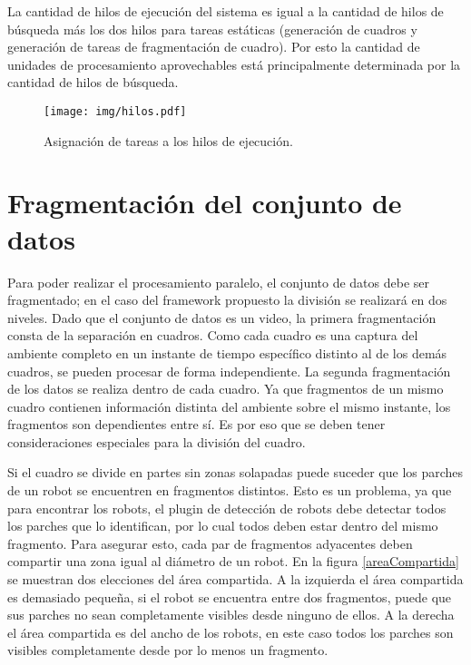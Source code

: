 La cantidad de hilos de ejecución del sistema es igual a la cantidad de hilos de
búsqueda más los dos hilos para tareas estáticas (generación de cuadros y
generación de tareas de fragmentación de cuadro). Por esto la cantidad de
unidades de procesamiento aprovechables está principalmente determinada por la
cantidad de hilos de búsqueda.

\begin{figure}[!htb]

	\texttt{[image: img/hilos.pdf]}

	\caption{Asignación de tareas a los hilos de ejecución.}

	\label{hilosFramework}

\end{figure}

\section{Fragmentación del conjunto de datos}

Para poder realizar el procesamiento paralelo, el conjunto de datos debe ser
fragmentado; en el caso del framework propuesto la división se realizará en
dos niveles. Dado que el conjunto de datos es un video, la primera
fragmentación consta de la separación en cuadros. Como cada cuadro es una
captura del ambiente completo en un instante de tiempo específico distinto al de
los demás cuadros, se pueden procesar de forma independiente. La segunda
fragmentación de los datos se realiza dentro de cada cuadro. Ya que fragmentos
de un mismo cuadro contienen información distinta del ambiente sobre el mismo
instante, los fragmentos son dependientes entre sí. Es por eso que se deben
tener consideraciones especiales para la división del cuadro.

Si el cuadro se divide en partes sin zonas solapadas puede suceder que los
parches de un robot se encuentren en fragmentos distintos. Esto es un problema,
ya que para encontrar los robots, el plugin de detección de robots debe detectar
todos los parches que lo identifican, por lo cual todos deben estar dentro del
mismo fragmento. Para asegurar esto, cada par de fragmentos adyacentes deben
compartir una zona igual al diámetro de un robot. En la figura
\ref{areaCompartida} se muestran dos elecciones del área compartida. A la
izquierda el área compartida es demasiado pequeña, si el robot se encuentra
entre dos fragmentos, puede que sus parches no sean completamente visibles desde
ninguno de ellos. A la derecha el área compartida es del ancho de los robots, en
este caso todos los parches son visibles completamente desde por lo menos un
fragmento.

